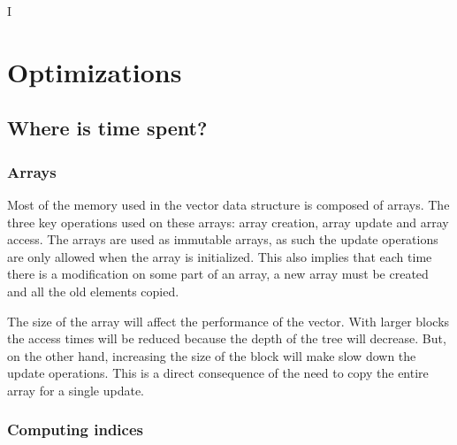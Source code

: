 I%

\chapter{Optimizations} %

\label{Optimizations} %



\section{Where is time spent?}


\subsection{Arrays}
Most of the memory used in the vector data structure is composed of arrays. The three key operations used on these arrays: array creation, array update and array access. The arrays are used as immutable arrays, as such the update operations are only allowed when the array is initialized. This also implies that each time there is a modification on some part of an array, a new array must be created and all the old elements copied.  

The size of the array will affect the performance of the vector. With larger blocks the access times will be reduced because the depth of the tree will decrease. But, on the other hand, increasing the size of the block will make slow down the update operations. This is a direct consequence of the need to copy the entire array for a single update.



\subsection{Computing indices}
\label{ComputingIndices}

